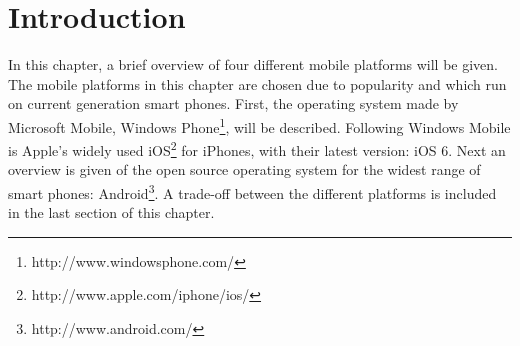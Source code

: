 \section{Introduction}
In this chapter, a brief overview of four different mobile platforms will be given. The mobile platforms in this chapter are chosen due to popularity and which run on current generation smart phones. First, the operating system made by Microsoft Mobile, Windows Phone\footnote{http://www.windowsphone.com/}, will be described. Following Windows Mobile is Apple's widely used iOS\footnote{http://www.apple.com/iphone/ios/} for iPhones, with their latest version: iOS 6. Next an overview is given of the open source operating system for the widest range of smart phones: Android\footnote{http://www.android.com/}. A trade-off between the different platforms is included in the last section of this chapter.